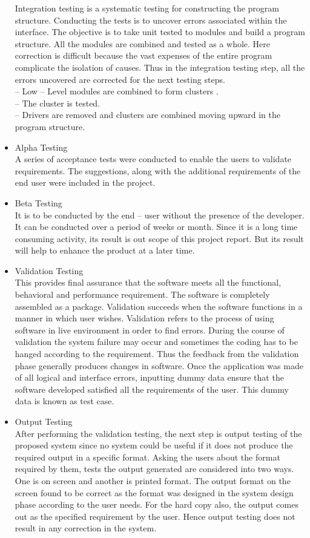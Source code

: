 \documentclass[12pt]{article}
\begin{document}
\begin{itemize}
Integration testing is a systematic testing for constructing the program structure. Conducting the tests is to uncover errors associated within the interface. The objective
is to take unit tested to modules and build a program structure. All the modules are
combined and tested as a whole. Here correction is difficult because the vast expenses
of the entire program complicate the isolation of causes. Thus in the integration testing
step, all the errors uncovered are corrected for the next testing steps.\\
– Low – Level modules are combined to form clusters .\\
– The cluster is tested.\\
– Drivers are removed and clusters are combined moving upward in the program
structure.
\item  Alpha Testing\\
A series of acceptance tests were conducted to enable the users to validate requirements. The suggestions, along with the additional requirements of the end user were
included in the project.
\item Beta Testing\\
It is to be conducted by the end – user without the presence of the developer. It
can be conducted over a period of weeks or month. Since it is a long time consuming
activity, its result is out scope of this project report. But its result will help to enhance the product at a later time.
\item  Validation Testing\\
This provides final assurance that the software meets all the functional, behavioral
and performance requirement. The software is completely assembled as a package.
Validation succeeds when the software functions in a manner in which user wishes.
Validation refers to the process of using software in live environment in order to find
errors. During the course of validation the system failure may occur and sometimes
the coding has to be hanged according to the requirement. Thus the feedback from
the validation phase generally produces changes in software. Once the application was
made of all logical and interface errors, inputting dummy data ensure that the software
developed satisfied all the requirements of the user. This dummy data is known as test
case.
\item Output Testing\\
After performing the validation testing, the next step is output testing of the proposed system since no system could be useful if it does not produce the required output
in a specific format. Asking the users about the format required by them, tests the
output generated are considered into two ways. One is on screen and another is printed
format. The output format on the screen found to be correct as the format was designed
in the system design phase according to the user needs. For the hard copy also, the
output comes out as the specified requirement by the user. Hence output testing does
not result in any correction in the system.
\end{itemize}
\end{document}
